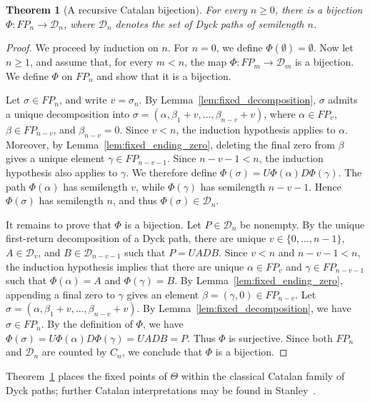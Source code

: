 \documentclass[11pt]{article}
\newtheorem{thm}{Theorem}[section]
\theoremstyle{remark}
\theoremstyle{definition}
\begin{document}
\begin{thm}[A recursive Catalan bijection]\label{thm:fixed_dyck_bijection}
For every $n\geq0$, there is a bijection $\Phi:FP_n\to\mathcal D_n$, where $\mathcal D_n$ denotes the set of Dyck paths of semilength $n$.
\end{thm}

\begin{proof}
We proceed by induction on $n$. For $n=0$, we define $\Phi(\emptyset)=\emptyset$.
Now let $n\geq 1$, and assume that, for every $m<n$, the map $\Phi:FP_m \to \mathcal D_m$ is a bijection. We define $\Phi$ on $FP_n$ and show that it is a bijection.

Let $\sigma\in FP_n$, and write $v=\sigma_n$.
By Lemma~\ref{lem:fixed_decomposition}, $\sigma$ admits a unique decomposition into $\sigma = (\alpha,\beta_1+v, \dots,\beta_{n-v}+v)$, where $\alpha\in FP_v$, $\beta\in FP_{n-v}$, and $\beta_{n-v}=0$.
Since $v<n$, the induction hypothesis applies to $\alpha$. Moreover, by
Lemma~\ref{lem:fixed_ending_zero}, deleting the final zero from $\beta$ gives a unique element $\gamma\in FP_{n-v-1}$.
Since $n-v-1<n$, the induction hypothesis also applies to $\gamma$.
We therefore define $\Phi(\sigma) = U\Phi(\alpha)D\Phi(\gamma)$.
The path $\Phi(\alpha)$ has semilength $v$, while $\Phi(\gamma)$ has semilength $n-v-1$. Hence $\Phi(\sigma)$ has semilength $n$, and thus $\Phi(\sigma)\in\mathcal D_n$.

It remains to prove that $\Phi$ is a bijection. Let $P\in\mathcal D_n$ be
nonempty. By the unique first-return decomposition of a Dyck path, there are
unique $v\in\{0,\ldots,n-1\}$, $A\in\mathcal D_v$, and $B\in\mathcal D_{n-v-1}$ such that $P=UADB$.
Since $v<n$ and $n-v-1<n$, the induction hypothesis implies that there are
unique $\alpha\in FP_v$ and $\gamma\in FP_{n-v-1}$ such that $\Phi(\alpha)=A$ and $\Phi(\gamma)=B$.
By Lemma~\ref{lem:fixed_ending_zero}, appending a final zero to $\gamma$ gives an element $\beta=(\gamma,0)\in FP_{n-v}$.
Let $\sigma = (\alpha,\beta_1+v, \dots,\beta_{n-v}+v)$.
By Lemma~\ref{lem:fixed_decomposition}, we have $\sigma\in FP_n$. By the
definition of $\Phi$, we have $\Phi(\sigma) = U\Phi(\alpha)D\Phi(\gamma) = UADB = P$.
Thus $\Phi$ is surjective. Since both $FP_n$ and $\mathcal D_n$ are counted by $C_n$, we conclude that $\Phi$ is a bijection.
\end{proof}

Theorem~\ref{thm:fixed_dyck_bijection} places the fixed points of $\Theta$ within the classical Catalan family of Dyck paths; further Catalan interpretations may be found in Stanley~\cite{Stanley_1999}.
\end{document}
